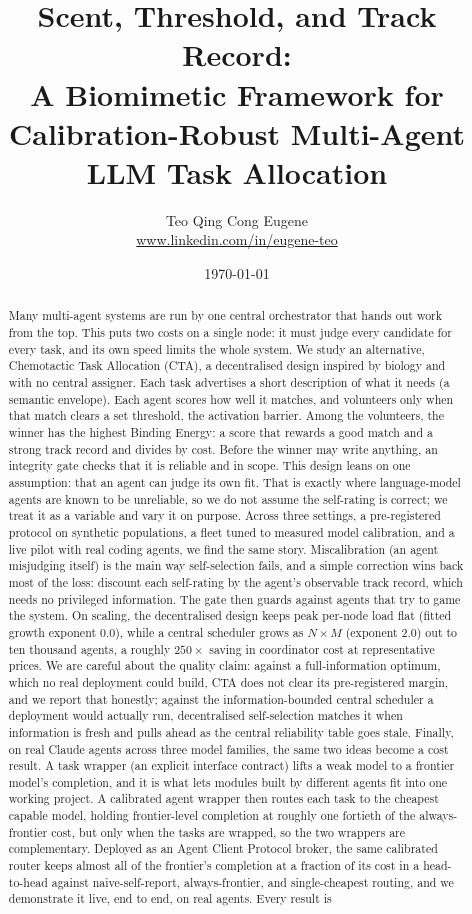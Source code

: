 \documentclass[11pt]{article}
\title{\bfseries Scent, Threshold, and Track Record:\\ A Biomimetic Framework for Calibration-Robust Multi-Agent LLM Task Allocation}
\author{Teo Qing Cong Eugene\\ \small \href{https://www.linkedin.com/in/eugene-teo}{www.linkedin.com/in/eugene-teo}}
\date{\today}
\begin{document}
\maketitle

\begin{abstract}
\noindent
Many multi-agent systems are run by one central orchestrator that hands out work from the top. This puts two costs on a single node: it must judge every candidate for every task, and its own speed limits the whole system. We study an alternative, Chemotactic Task Allocation (CTA), a decentralised design inspired by biology and with no central assigner. Each task advertises a short description of what it needs (a semantic envelope). Each agent scores how well it matches, and volunteers only when that match clears a set threshold, the activation barrier. Among the volunteers, the winner has the highest Binding Energy: a score that rewards a good match and a strong track record and divides by cost. Before the winner may write anything, an integrity gate checks that it is reliable and in scope. This design leans on one assumption: that an agent can judge its own fit. That is exactly where language-model agents are known to be unreliable, so we do not assume the self-rating is correct; we treat it as a variable and vary it on purpose. Across three settings, a pre-registered protocol on synthetic populations, a fleet tuned to measured model calibration, and a live pilot with real coding agents, we find the same story. Miscalibration (an agent misjudging itself) is the main way self-selection fails, and a simple correction wins back most of the loss: discount each self-rating by the agent's observable track record, which needs no privileged information. The gate then guards against agents that try to game the system. On scaling, the decentralised design keeps peak per-node load flat (fitted growth exponent $0.0$), while a central scheduler grows as $N\times M$ (exponent $2.0$) out to ten thousand agents, a roughly $250\times$ saving in coordinator cost at representative prices. We are careful about the quality claim: against a full-information optimum, which no real deployment could build, CTA does not clear its pre-registered margin, and we report that honestly; against the information-bounded central scheduler a deployment would actually run, decentralised self-selection matches it when information is fresh and pulls ahead as the central reliability table goes stale. Finally, on real Claude agents across three model families, the same two ideas become a cost result. A task wrapper (an explicit interface contract) lifts a weak model to a frontier model's completion, and it is what lets modules built by different agents fit into one working project. A calibrated agent wrapper then routes each task to the cheapest capable model, holding frontier-level completion at roughly one fortieth of the always-frontier cost, but only when the tasks are wrapped, so the two wrappers are complementary. Deployed as an Agent Client Protocol broker, the same calibrated router keeps almost all of the frontier's completion at a fraction of its cost in a head-to-head against naive-self-report, always-frontier, and single-cheapest routing, and we demonstrate it live, end to end, on real agents. Every result is 
\end{abstract}
\end{document}
